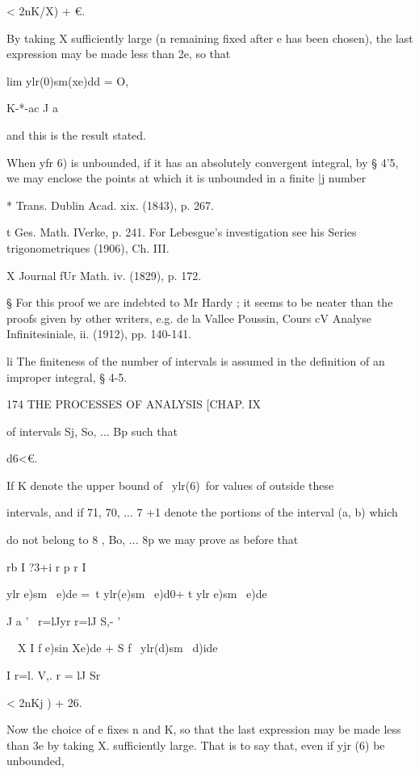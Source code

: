 < 2nK/X) + €. 

By taking X sufficiently large (n remaining fixed after e has been chosen), 
the last expression may be made less than 2e, so that 



lim ylr(0)sm(xe)dd = O, 

K-*-ac J a 

and this is the result stated. 

When yfr 6) is unbounded, if it has an absolutely convergent integral, by 
§ 4'5, we may enclose the points at which it is unbounded in a finite |j number 

* Trans. Dublin Acad. xix. (1843), p. 267. 

t Ges. Math. IVerke, p. 241. For Lebesgue's investigation see his Series trigonometriques 
(1906), Ch. III. 

X Journal fUr Math. iv. (1829), p. 172. 

§ For this proof we are indebted to Mr Hardy ; it seems to be neater than the proofs given by 
other writers, e.g. de la Vallee Poussin, Cours cV Analyse Infinitesiniale, ii. (1912), pp. 140-141. 

li The finiteness of the number of intervals is assumed in the definition of an improper 
integral, § 4-5. 



174 THE PROCESSES OF ANALYSIS [CHAP. IX 

of intervals Sj, So, ... Bp such that 

d6<€. 






If K denote the upper bound of \ ylr(6)\ for values of outside these 

intervals, and if 71, 70, ... 7 +1 denote the portions of the interval (a, b) which 

do not belong to 8 , Bo, ... 8p we may prove as before that 

rb I ?3+i r p r I 

ylr e)sm \ e)de =\ t ylr(e)sm \ e)d0+ t ylr e)sm \ e)de\ 

J a ' \ r=lJyr r=lJ S,- ' 

 \ \  X I f e)sin Xe)de + S f \ ylr(d)sm \ d)ide 

I r=l. V,. r = lJ Sr 

<  2nKj )  + 26. 

Now the choice of e fixes n and K, so that the last expression may be 
made less than 3e by taking X. sufficiently large. That is to say that, even 
if yjr (6) be unbounded, 

